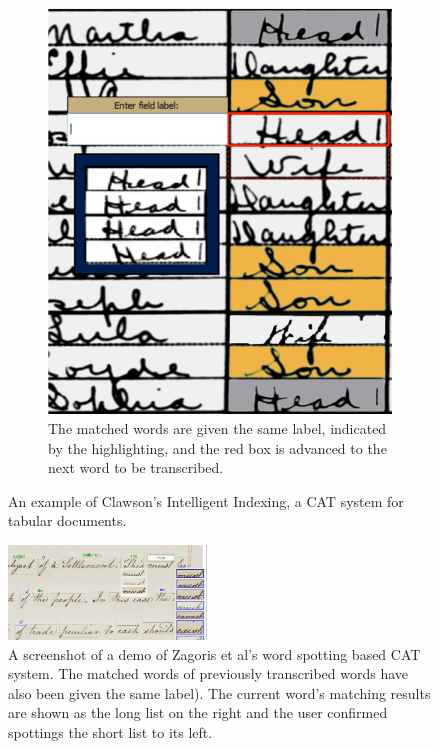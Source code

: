 \documentclass[conference]{IEEEtran}
\begin{document}
\begin{figure}
\begin{subfigure}[t]{0.23\textwidth}
    		\includegraphics[width=\textwidth]{ii_ex_new_b}
    		\caption{The matched words are given the same label, indicated by the highlighting, and the red box is advanced to the next word to be transcribed.}
    	\end{subfigure}
    	\caption{An example of Clawson's Intelligent Indexing, a CAT system for tabular documents.}
    	\label{fig:ii}
\end{figure}

\begin{figure}
    \centering
    \includegraphics[width=0.47\textwidth]{zagoris}
    \caption{A screenshot of a demo of Zagoris et al's word spotting based CAT system. The matched words of previously transcribed words have also been given the same label). The current word's matching results are shown as the long list on the right and the user confirmed spottings the short list to its left.}
    \label{fig:zagoris}
\end{figure}
\end{document}
